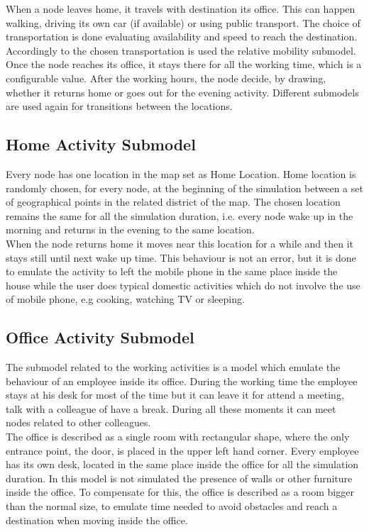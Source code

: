 When a node leaves home, it travels with destination its office. This can happen walking, driving its own car (if available) or using public transport. The choice of transportation is done evaluating availability and speed to reach the destination. Accordingly to the chosen transportation is used the relative mobility submodel.
\\

Once the node reaches its office, it stays there for all the working time, which is a configurable value. After the working hours, the node decide, by drawing, whether it returns home or goes out for the evening activity. Different submodels are used again for transitions between the locations.


\subsection{Home Activity Submodel}
Every node has one location in the map set as Home Location. Home location is randomly chosen, for every node, at the beginning of the simulation between a set of geographical points in the related district of the map. The chosen location remains the same for all the simulation duration, i.e. every node wake up in the morning and returns in the evening to the same location.
\\

When the node returns home it moves near this location for a while and then it stays still until next wake up time. This behaviour is not an error, but it is done to emulate the activity to left the mobile phone in the same place inside the house while the user does typical domestic activities which do not involve the use of mobile phone, e.g cooking, watching TV or sleeping.

\subsection{Office Activity Submodel}
The submodel related to the working activities is a model which emulate the behaviour of an employee inside its office. During the working time the employee stays at his desk for most of the time but it can leave it for attend a meeting, talk with a colleague of have a break. During all these moments it can meet nodes related to other colleagues.
\\

The office is described as a single room with rectangular shape, where the only entrance point, the door, is placed in the upper left hand corner. Every employee has its own desk, located in the same place inside the office for all the simulation duration. In this model is not simulated the presence of walls or other furniture inside the office. To compensate for this, the office is described as a room bigger than the normal size, to emulate time needed to avoid obstacles and reach a destination when moving inside the office.
\\

